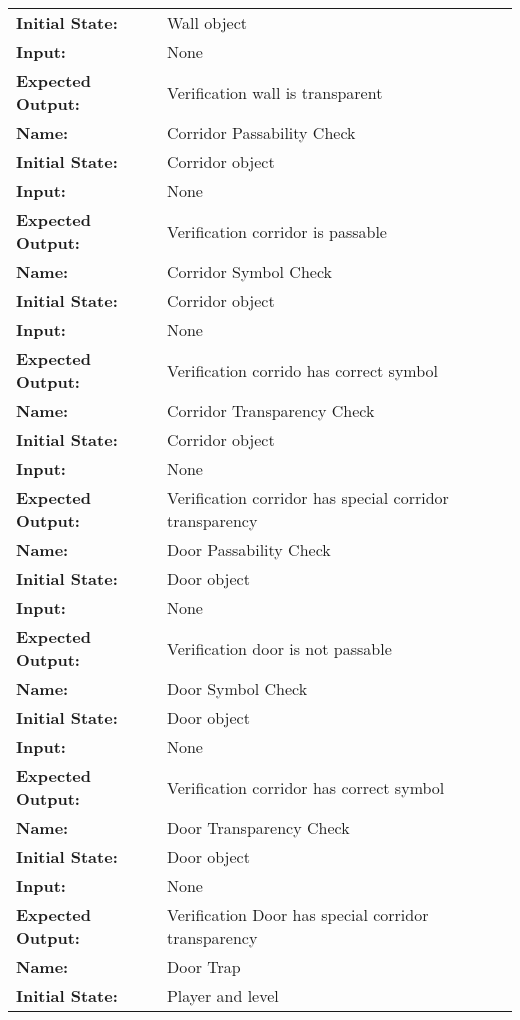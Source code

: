 \documentclass[12pt, titlepage]{article}
\begin{document}
\begin{center}
\begin{longtable}{ l | p{10cm} }
				\textbf{Initial State:} & Wall object\\
				\textbf{Input:} & None\\
				\textbf{Expected Output:} & Verification wall is transparent\\
				\textbf{Name:} & Corridor Passability Check\\
				\textbf{Initial State:} & Corridor object\\
				\textbf{Input:} & None\\
				\textbf{Expected Output:} & Verification corridor is passable\\
				\hline
				\textbf{Name:} & Corridor Symbol Check\\
				\textbf{Initial State:} & Corridor object\\
				\textbf{Input:} & None\\
				\textbf{Expected Output:} & Verification corrido has correct symbol\\
				\hline
				\textbf{Name:} & Corridor Transparency Check\\
				\textbf{Initial State:} & Corridor object\\
				\textbf{Input:} & None\\
				\textbf{Expected Output:} & Verification corridor has special corridor transparency\\
				\hline
				\textbf{Name:} & Door Passability Check\\
				\textbf{Initial State:} & Door object\\
				\textbf{Input:} & None\\
				\textbf{Expected Output:} & Verification door is not passable\\
				\hline
				\textbf{Name:} & Door Symbol Check\\
				\textbf{Initial State:} & Door object\\
				\textbf{Input:} & None\\
				\textbf{Expected Output:} & Verification corridor has correct symbol\\
				\hline
				\textbf{Name:} & Door Transparency Check\\
				\textbf{Initial State:} & Door object\\
				\textbf{Input:} & None\\
				\textbf{Expected Output:} & Verification Door has special corridor transparency\\
				\hline
				\textbf{Name:} & Door Trap\\
				\textbf{Initial State:} & Player and level\\

\end{longtable}
\end{center}
\end{document}
